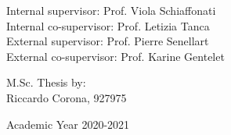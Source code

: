 {\begin{center}
\vspace{2cm}

\end{center}


\vspace{2.5cm}
\large
\begin{flushleft}
Internal supervisor: Prof. Viola Schiaffonati \\
Internal co-supervisor: Prof. Letizia Tanca \\
External supervisor: Prof. Pierre Senellart \\
External co-supervisor: Prof. Karine Gentelet \\
\end{flushleft}

\vspace{1cm}

\begin{flushright}
M.Sc. Thesis by: \\
Riccardo Corona, 927975 \\
\end{flushright}

\vspace{1.5cm}

\begin{center}
Academic Year 2020-2021
\end{center}

\clearpage
}
